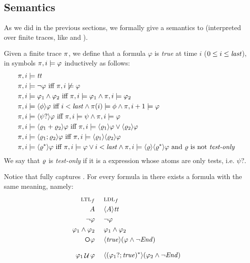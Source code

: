 \subsection{Semantics}
As we did in the previous sections, we formally give a semantics to \LDLf (interpreted over finite traces, like \LTLf and \REGEX).

\begin{definition}
	Given a finite trace $\pi$, we define that a \LDLf formula $\varphi$ is \emph{true} at time $i$ ($0 \le i \le \mathit{last}$), in symbols $\pi, i \models \varphi$ inductively as follows:
	\begin{align*}
	\pi, i &\models {\mathit{tt}}\nonumber\\
	\pi, i &\models \lnot \varphi \ \text{iff}\  \pi, i \not\models \varphi\nonumber\\
	\pi, i &\models \varphi_1 \wedge \varphi_2 \ \text{iff}\  \pi, i \models \varphi_1 \wedge \pi, i \models \varphi_2\nonumber\\
	\pi, i &\models \langle \phi \rangle\varphi \ \text{iff}\  i<\mathit{last} \wedge \pi(i) \models \phi \wedge \pi, i+1 \models \varphi\\
	\pi, i &\models \langle \psi? \rangle\varphi \ \text{iff}\  \pi, i \models \psi \wedge \pi, i \models \varphi\\
	\pi, i &\models \langle \varrho_1 + \varrho_2 \rangle\varphi \ \text{iff}\  \pi, i \models \langle \varrho_1 \rangle\varphi \vee \langle \varrho_2 \rangle\varphi\\
	\pi, i &\models \langle \varrho_1 ; \varrho_2 \rangle\varphi \ \text{iff}\  \pi, i \models \langle \varrho_1 \rangle\langle \varrho_2 \rangle\varphi\\
	\pi, i &\models \langle \varrho^* \rangle\varphi \ \text{iff}\  \pi, i \models \varphi
	\vee i<\mathit{last} \wedge \pi, i \models \langle \varrho \rangle\langle \varrho^* \rangle\varphi \text{ and $\varrho$ is not \emph{test-only}}
	\end{align*}
	We say that $\varrho$ is \emph{test-only} if it is a \RE expression whose atoms are only tests, i.e. $\psi?$.
\end{definition}

Notice that \LDLf fully captures \LTLf. For every formula in \LTLf there exists a \LDLf formula with the same meaning, namely:
\begin{align*}
	\textsc{ltl}_f &\ind \textsc{ldl}_f\\
	A  &\ind  \DIAM{A}\ttrue\\
	\lnot \varphi &\ind \lnot \varphi\\
	\varphi_1 \lAND \varphi_2 &\ind \varphi_1 \lAND \varphi_2\\
	\Next \varphi &\ind \DIAM{\true}(\varphi \lAND \lnot\Ended)\\
	\varphi_1 \lUntil \varphi &\ind \DIAM{(\varphi_1?; \true)^*}(\varphi_2 \lAND\lnot \Ended)
\end{align*}

